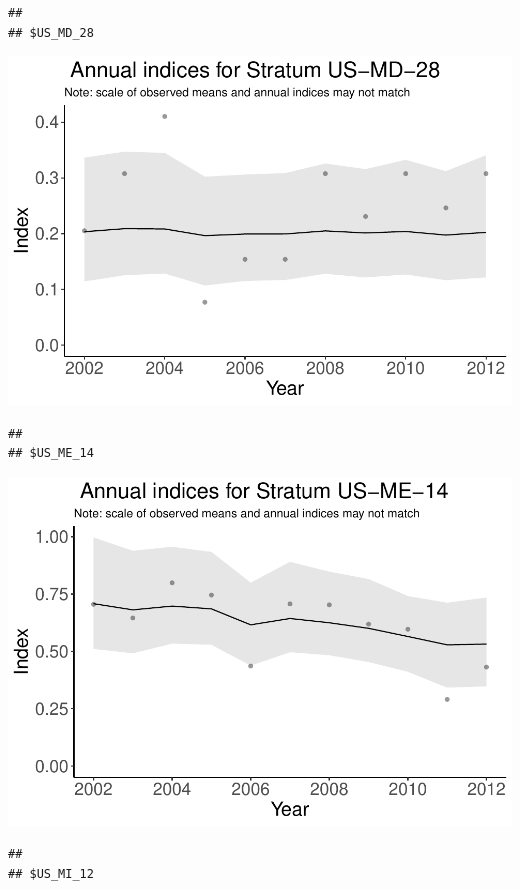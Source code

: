 \documentclass[]{article}
\begin{document}
\begin{verbatim}
## 
## $US_MD_28
\end{verbatim}

\includegraphics{index_files/figure-latex/unnamed-chunk-7-18.pdf}

\begin{verbatim}
## 
## $US_ME_14
\end{verbatim}

\includegraphics{index_files/figure-latex/unnamed-chunk-7-19.pdf}

\begin{verbatim}
## 
## $US_MI_12
\end{verbatim}
\end{document}
